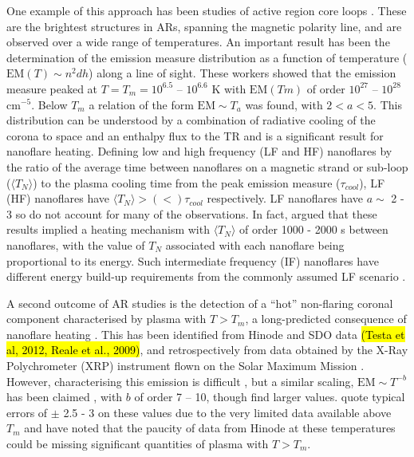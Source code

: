 \documentclass[apj]{emulateapj}
\begin{document}
	\par One example of this approach has been studies of active region core loops \citep{warren_constraints_2011,warren_systematic_2012,winebarger_using_2011,tripathi_emission_2011,schmelz_cold_2012,bradshaw_diagnosing_2012,reep_diagnosing_2013,del_zanna_elemental_2014}. These are the brightest structures in ARs, spanning the magnetic polarity line, and are observed over a wide range of temperatures. An important result has been the determination of the emission measure distribution as a function of temperature ($\mathrm{EM}(T)\sim n^2dh$) along a line of sight. These workers showed that the emission measure peaked at $T = T_m = 10^{6.5}$ – $10^{6.6}$ K with $\mathrm{EM}(Tm)$ of order $10^{27}$ – $10^{28}$ cm$^{-5}$.  Below $T_m$ a relation of the form $\mathrm{EM} \sim T_a$ was found, with $2 < a < 5$. This distribution can be understood by a combination of radiative cooling of the corona to space and an enthalpy flux to the TR \citep[e.g.][]{bradshaw_new_2010,bradshaw_cooling_2010} and is a significant result for nanoflare heating. Defining low and high frequency (LF and HF) nanoflares by the ratio of the average time between nanoflares on a magnetic strand or sub-loop ($\langle T_N \rangle$) to the plasma cooling time from the peak emission measure ($\tau_{cool}$), LF (HF) nanoflares have $\langle T_N \rangle > (<) \tau_{cool}$ respectively. LF nanoflares have $a \sim$ 2 - 3 so do not account for many of the observations. In fact, \citet{cargill_active_2014} argued that these results implied a heating mechanism with $\langle T_N \rangle$ of order 1000 - 2000 s between nanoflares, with the value of $T_N$ associated with each nanoflare being proportional to its energy. Such intermediate frequency (IF) nanoflares have different energy build-up requirements from the commonly assumed LF scenario \citep{cargill_active_2014}.  
%
	\par A second outcome of AR studies is the detection of a ``hot'' non-flaring coronal component characterised by plasma with $T > T_m$, a long-predicted consequence of nanoflare heating \citep{cargill_implications_1994,cargill_diagnostics_1995}. This has been identified from Hinode and SDO data \hl{(Testa et al, 2012, Reale et al., 2009)}, and retrospectively from data obtained by the X-Ray Polychrometer (XRP) instrument flown on the Solar Maximum Mission \citep{del_zanna_elemental_2014}. However, characterising this emission is difficult \citep[e.g.][]{winebarger_defining_2012}, but a similar scaling, $\mathrm{EM} \sim T^{-b}$ has been claimed \citep[e.g.][]{warren_systematic_2012}, with $b$ of order 7 – 10, though \citet{del_zanna_elemental_2014} find larger values. \citeauthor{warren_systematic_2012} quote typical errors of $\pm$ 2.5 - 3 on these values due to the very limited data available above $T_m$ and \citet{winebarger_defining_2012} have noted that the paucity of data from Hinode at these temperatures could be missing significant quantities of plasma with $T > T_m$. 
\end{document}
